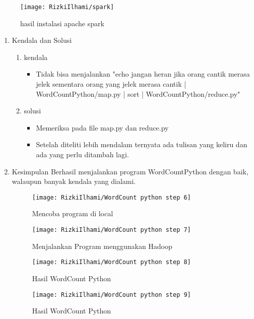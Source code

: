 \begin{figure}[!ht]
\texttt{[image: RizkiIlhami/spark]}
\caption{hasil instalasi apache spark }
\label{gam:hasil instalasi spark}
\end{figure}

\clearpage
{}
\begin{enumerate}
\item Kendala dan Solusi

\begin{enumerate}
    \item kendala
\begin{itemize}
    \item Tidak bisa menjalankan {\color{red}"echo jangan heran jika orang cantik merasa jelek sementara
    orang yang jelek merasa cantik | WordCountPython/map.py |
    sort | WordCountPython/reduce.py"}
\end{itemize}
    \item solusi
\begin{itemize}
    \item Memeriksa pada {\color{red}file map.py} dan {\color{red}reduce.py}
    \item Setelah diteliti lebih mendalam ternyata ada tulisan yang keliru dan ada yang perlu ditambah lagi.
\end{itemize}
\end{enumerate}

\item Kesimpulan
\newline Berhasil menjalankan program WordCountPython dengan baik, walaupun banyak kendala yang dialami.


\begin{figure}[!ht]
    \texttt{[image: RizkiIlhami/WordCount python step 6]}
    \caption{Mencoba program di local }
    \label{gam:hasil WordCountPython}
    \end{figure}

\begin{figure}[!ht]
    \texttt{[image: RizkiIlhami/WordCount python step 7]}
    \caption{Menjalankan Program menggunakan Hadoop }
    \label{gam:hasil WordCountPython}
\end{figure}

\begin{figure}[!ht]
    \texttt{[image: RizkiIlhami/WordCount python step 8]}
    \caption{Hasil WordCount Python }
    \label{gam:hasil WordCountPython}
\end{figure}

\begin{figure}[!ht]
    \texttt{[image: RizkiIlhami/WordCount python step 9]}
    \caption{Hasil WordCount Python }
    \label{gam:hasil WordCountPython}
\end{figure}

\end{enumerate}

